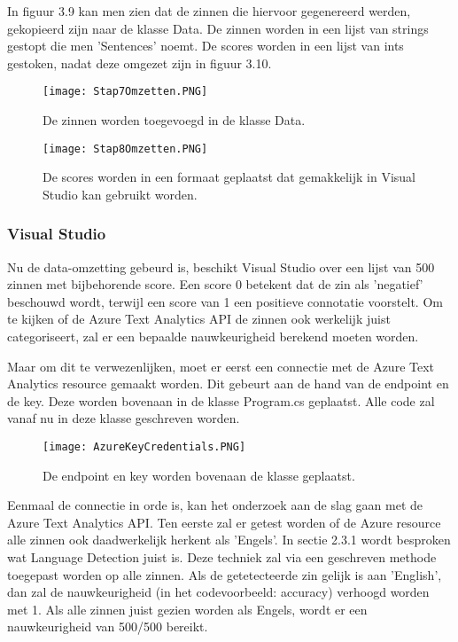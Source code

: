In figuur 3.9 kan men zien dat de zinnen die hiervoor gegenereerd werden, gekopieerd zijn naar de klasse Data. De zinnen worden in een lijst van strings gestopt die men 'Sentences' noemt. De scores worden in een lijst van ints gestoken, nadat deze omgezet zijn in figuur 3.10.

\begin{figure}[!htbp]
    \texttt{[image: Stap7Omzetten.PNG]}
    \caption{\label{stap7amazon}De zinnen worden toegevoegd in de klasse Data.}
\end{figure}
\FloatBarrier

\begin{figure}[!htbp]
    \texttt{[image: Stap8Omzetten.PNG]}
    \caption{\label{stap8amazon}De scores worden in een formaat geplaatst dat gemakkelijk in Visual Studio kan gebruikt worden.}
\end{figure}
\FloatBarrier


\subsubsection{Visual Studio}
\label{amazondatasetvisualstudioazure}
Nu de data-omzetting gebeurd is, beschikt Visual Studio over een lijst van 500 zinnen met bijbehorende score. Een score 0 betekent dat de zin als 'negatief' beschouwd wordt, terwijl een score van 1 een positieve connotatie voorstelt. Om te kijken of de Azure Text Analytics API de zinnen ook werkelijk juist categoriseert, zal er een bepaalde nauwkeurigheid berekend moeten worden. 

Maar om dit te verwezenlijken, moet er eerst een connectie met de Azure Text Analytics resource gemaakt worden. Dit gebeurt aan de hand van de endpoint en de key. Deze worden bovenaan in de klasse Program.cs geplaatst. Alle code zal vanaf nu in deze klasse geschreven worden. 

\begin{figure}[!htbp]
    \texttt{[image: AzureKeyCredentials.PNG]}
    \caption{\label{azurecredentials}De endpoint en key worden bovenaan de klasse geplaatst.}
\end{figure}
\FloatBarrier

Eenmaal de connectie in orde is, kan het onderzoek aan de slag gaan met de Azure Text Analytics API. Ten eerste zal er getest worden of de Azure resource alle zinnen ook daadwerkelijk herkent als 'Engels'. In sectie 2.3.1 wordt besproken wat Language Detection juist is. Deze techniek zal via een geschreven methode toegepast worden op alle zinnen. Als de getetecteerde zin gelijk is aan 'English', dan zal de nauwkeurigheid (in het codevoorbeeld: accuracy) verhoogd worden met 1. Als alle zinnen juist gezien worden als Engels, wordt er een nauwkeurigheid van 500/500 bereikt. 

